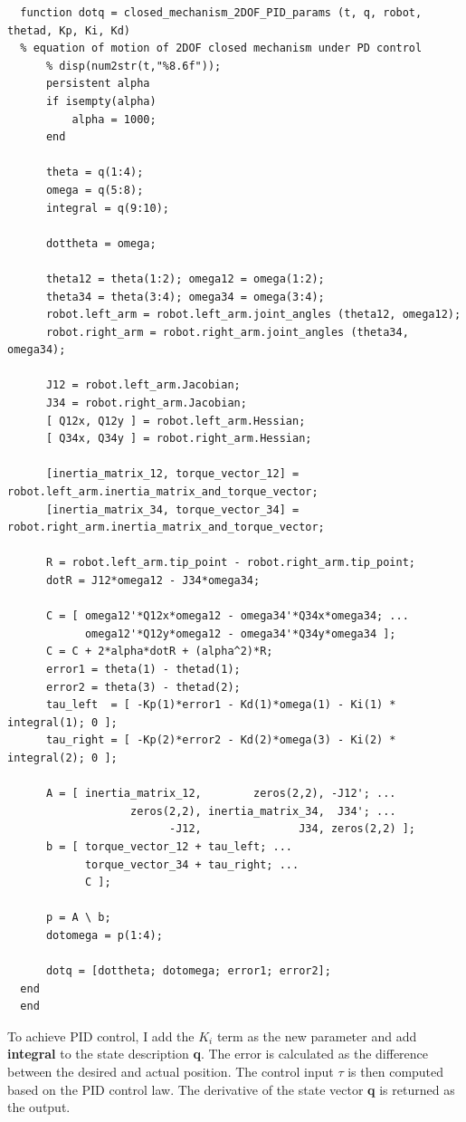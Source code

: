 \documentclass{article}
\begin{document}
\begin{verbatim}
  function dotq = closed_mechanism_2DOF_PID_params (t, q, robot, thetad, Kp, Ki, Kd)
  % equation of motion of 2DOF closed mechanism under PD control
      % disp(num2str(t,"%8.6f"));
      persistent alpha
      if isempty(alpha)
          alpha = 1000;
      end
      
      theta = q(1:4);
      omega = q(5:8);
      integral = q(9:10);
      
      dottheta = omega;
      
      theta12 = theta(1:2); omega12 = omega(1:2);
      theta34 = theta(3:4); omega34 = omega(3:4);
      robot.left_arm = robot.left_arm.joint_angles (theta12, omega12);
      robot.right_arm = robot.right_arm.joint_angles (theta34, omega34);
      
      J12 = robot.left_arm.Jacobian;
      J34 = robot.right_arm.Jacobian;    
      [ Q12x, Q12y ] = robot.left_arm.Hessian;
      [ Q34x, Q34y ] = robot.right_arm.Hessian;
      
      [inertia_matrix_12, torque_vector_12] = robot.left_arm.inertia_matrix_and_torque_vector;
      [inertia_matrix_34, torque_vector_34] = robot.right_arm.inertia_matrix_and_torque_vector;
      
      R = robot.left_arm.tip_point - robot.right_arm.tip_point;
      dotR = J12*omega12 - J34*omega34;
  
      C = [ omega12'*Q12x*omega12 - omega34'*Q34x*omega34; ...
            omega12'*Q12y*omega12 - omega34'*Q34y*omega34 ];
      C = C + 2*alpha*dotR + (alpha^2)*R;
      error1 = theta(1) - thetad(1);
      error2 = theta(3) - thetad(2);
      tau_left  = [ -Kp(1)*error1 - Kd(1)*omega(1) - Ki(1) * integral(1); 0 ];
      tau_right = [ -Kp(2)*error2 - Kd(2)*omega(3) - Ki(2) * integral(2); 0 ];
      
      A = [ inertia_matrix_12,        zeros(2,2), -J12'; ...
                   zeros(2,2), inertia_matrix_34,  J34'; ...
                         -J12,               J34, zeros(2,2) ];
      b = [ torque_vector_12 + tau_left; ...
            torque_vector_34 + tau_right; ...
            C ];
      
      p = A \ b;
      dotomega = p(1:4);
      
      dotq = [dottheta; dotomega; error1; error2];
  end
  end
\end{verbatim}

To achieve PID control, I add the $K_i$ term as the new parameter and add \textbf{integral} to the state description \textbf{q}. The error is calculated as the difference between the desired and actual position. The control input \(\tau\) is then computed based on the PID control law. The derivative of the state vector \textbf{q} is returned as the output.
\end{document}
